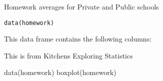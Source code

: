 \begin{Description}\relax
Homework averages for Private and Public schools
\end{Description}
\begin{Usage}
\begin{verbatim}data(homework)\end{verbatim}
\end{Usage}
\begin{Format}\relax
This data frame contains the following columns:
\end{Format}
\begin{Source}\relax
This is from Kitchens Exploring Statistics
\end{Source}
\begin{Examples}
\begin{ExampleCode}
data(homework)
boxplot(homework)
\end{ExampleCode}
\end{Examples}

